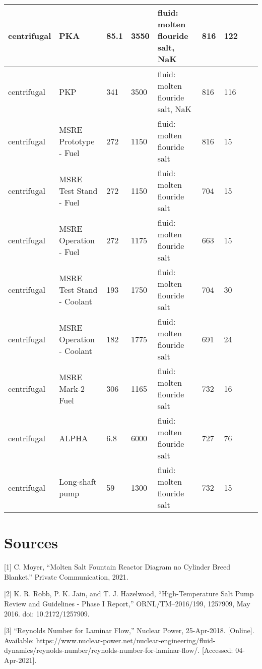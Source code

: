 \documentclass[11pt]{article}
\begin{document}
\begin{landscape}
\begin{table}[ht]
{\begin{tabular}{|l|l|l|l|l|l|l|l|l|}
          centrifugal & PKA & 85.1 & 3550 & fluid: molten flouride salt, NaK & 816 & 122 \\ \hline
          centrifugal & PKP & 341 & 3500 & fluid: molten flouride salt, NaK & 816 & 116 \\ \hline
          centrifugal & MSRE Prototype - Fuel & 272 & 1150 & fluid: molten flouride salt & 816 & 15 \\ \hline
          centrifugal & MSRE Test Stand - Fuel & 272 & 1150 & fluid: molten flouride salt & 704 & 15 \\ \hline
          centrifugal & MSRE Operation - Fuel & 272 & 1175 & fluid: molten flouride salt & 663 & 15 \\ \hline
          centrifugal & MSRE Test Stand - Coolant & 193 & 1750 & fluid: molten flouride salt & 704 & 30 \\ \hline
          centrifugal & MSRE Operation - Coolant & 182 & 1775 & fluid: molten flouride salt & 691 & 24 \\ \hline
          centrifugal & MSRE Mark-2 Fuel & 306 & 1165 & fluid: molten flouride salt & 732 & 16 \\ \hline
          centrifugal & ALPHA & 6.8 & 6000 & fluid: molten flouride salt & 727 & 76 \\ \hline
          centrifugal & Long-shaft pump & 59 & 1300 & fluid: molten flouride salt & 732 & 15 &  \\ \hline
      \end{tabular}}
\end{table}
\end{landscape}

\section{Sources}
[1]
C. Moyer, “Molten Salt Fountain Reactor Diagram no Cylinder Breed Blanket.” Private Communication, 2021. \newline

[2]
K. R. Robb, P. K. Jain, and T. J. Hazelwood, “High-Temperature Salt Pump Review and Guidelines - Phase I Report,” ORNL/TM--2016/199, 1257909, May 2016. doi: 10.2172/1257909. \newline

[3]
“Reynolds Number for Laminar Flow,” Nuclear Power, 25-Apr-2018. [Online]. Available: https://www.nuclear-power.net/nuclear-engineering/fluid-dynamics/reynolds-number/reynolds-number-for-laminar-flow/. [Accessed: 04-Apr-2021].
\end{document}
